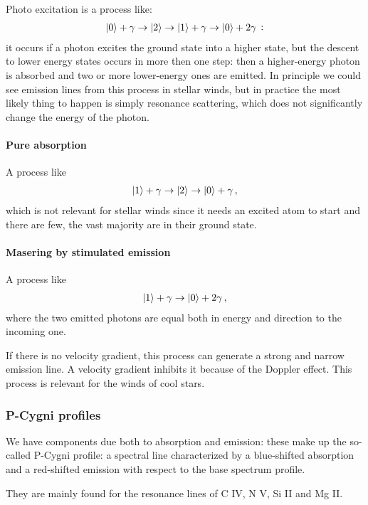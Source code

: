 \documentclass[main.tex]{subfiles}
\begin{document}
Photo excitation is a process like: 
%
\begin{align}
\ket{0} + \gamma \rightarrow
\ket{2} 
\rightarrow
\ket{1} + \gamma 
\rightarrow
\ket{0} + 2 \gamma 
\,:
\end{align}
%
it occurs if a photon excites the ground state into a higher state, but the descent to lower energy states occurs in more then one step: then a higher-energy photon is absorbed and two or more lower-energy ones are emitted.
In principle we could see emission lines from this process in stellar winds, but in practice the most likely thing to happen is simply resonance scattering, which does not significantly change the energy of the photon.

\paragraph{Pure absorption}
A process like 
%
\begin{align}
\ket{1} + \gamma \rightarrow \ket{2} 
\rightarrow \ket{0}  + \gamma 
\,,
\end{align}
%
which is not relevant for stellar winds since it needs an excited atom to start and there are few, the vast majority are in their ground state.

\paragraph{Masering by stimulated emission}
A process like 
%
\begin{align}
\ket{1} + \gamma 
\rightarrow \ket{0} + 2 \gamma 
\,,
\end{align}
%
where the two emitted photons are equal both in energy and direction to the incoming one. 

If there is no velocity gradient, this process can generate a strong and narrow emission line. 
A velocity gradient inhibits it because of the Doppler effect.
This process is relevant for the winds of cool stars.

\subsubsection{P-Cygni profiles}

We have components due both to absorption and emission: these make up the so-called P-Cygni profile: a spectral line characterized  by a blue-shifted absorption and a red-shifted emission with respect to the base spectrum profile.

They are mainly found for the resonance lines of C IV, N V, Si II and Mg II. 
\end{document}

